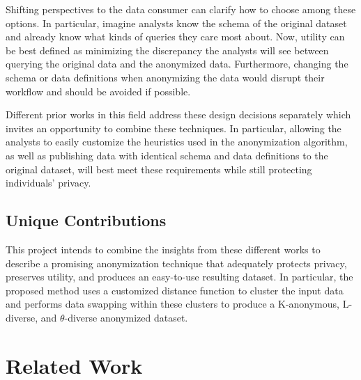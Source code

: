 Shifting perspectives to the data consumer can clarify how to choose among these options. In particular, imagine analysts know the schema of the original dataset and already know what kinds of queries they care most about. Now, utility can be best defined as minimizing the discrepancy the analysts will see between querying the original data and the anonymized data. Furthermore, changing the schema or data definitions when anonymizing the data would disrupt their workflow and should be avoided if possible.

Different prior works in this field address these design decisions separately which invites an opportunity to combine these techniques. In particular, allowing the analysts to easily customize the heuristics used in the anonymization algorithm, as well as publishing data with identical schema and data definitions to the original dataset, will best meet these requirements while still protecting individuals' privacy.

\subsection{Unique Contributions}
This project intends to combine the insights from these different works to describe a promising anonymization technique that adequately protects privacy, preserves utility, and produces an easy-to-use resulting dataset. In particular, the proposed method uses a customized distance function\cite{jiaPad} to cluster the input data and performs data swapping\cite{soriaSwapping} within these clusters to produce a K-anonymous, L-diverse\cite{machanavajjhalalDiversity}, and $\theta$-diverse anonymized dataset.

\section{Related Work}
